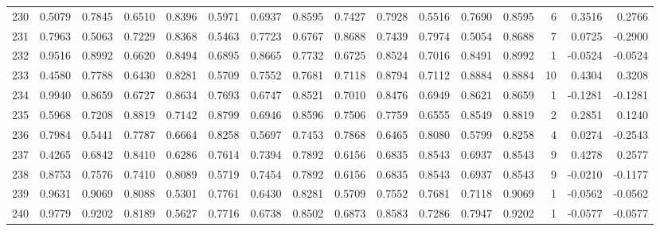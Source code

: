 \begin{tabular}{lrrrrrrrrrrrrrrr}
230 &      0.5079 &  0.7845 &  0.6510 &  0.8396 &  0.5971 &  0.6937 &  0.8595 &  0.7427 &  0.7928 &  0.5516 &   0.7690 &     0.8595 &      6 &                    0.3516 &                     0.2766 \\
231 &      0.7963 &  0.5063 &  0.7229 &  0.8368 &  0.5463 &  0.7723 &  0.6767 &  0.8688 &  0.7439 &  0.7974 &   0.5054 &     0.8688 &      7 &                    0.0725 &                    -0.2900 \\
232 &      0.9516 &  0.8992 &  0.6620 &  0.8494 &  0.6895 &  0.8665 &  0.7732 &  0.6725 &  0.8524 &  0.7016 &   0.8491 &     0.8992 &      1 &                   -0.0524 &                    -0.0524 \\
233 &      0.4580 &  0.7788 &  0.6430 &  0.8281 &  0.5709 &  0.7552 &  0.7681 &  0.7118 &  0.8794 &  0.7112 &   0.8884 &     0.8884 &     10 &                    0.4304 &                     0.3208 \\
234 &      0.9940 &  0.8659 &  0.6727 &  0.8634 &  0.7693 &  0.6747 &  0.8521 &  0.7010 &  0.8476 &  0.6949 &   0.8621 &     0.8659 &      1 &                   -0.1281 &                    -0.1281 \\
235 &      0.5968 &  0.7208 &  0.8819 &  0.7142 &  0.8799 &  0.6946 &  0.8596 &  0.7506 &  0.7759 &  0.6555 &   0.8549 &     0.8819 &      2 &                    0.2851 &                     0.1240 \\
236 &      0.7984 &  0.5441 &  0.7787 &  0.6664 &  0.8258 &  0.5697 &  0.7453 &  0.7868 &  0.6465 &  0.8080 &   0.5799 &     0.8258 &      4 &                    0.0274 &                    -0.2543 \\
237 &      0.4265 &  0.6842 &  0.8410 &  0.6286 &  0.7614 &  0.7394 &  0.7892 &  0.6156 &  0.6835 &  0.8543 &   0.6937 &     0.8543 &      9 &                    0.4278 &                     0.2577 \\
238 &      0.8753 &  0.7576 &  0.7410 &  0.8089 &  0.5719 &  0.7454 &  0.7892 &  0.6156 &  0.6835 &  0.8543 &   0.6937 &     0.8543 &      9 &                   -0.0210 &                    -0.1177 \\
239 &      0.9631 &  0.9069 &  0.8088 &  0.5301 &  0.7761 &  0.6430 &  0.8281 &  0.5709 &  0.7552 &  0.7681 &   0.7118 &     0.9069 &      1 &                   -0.0562 &                    -0.0562 \\
240 &      0.9779 &  0.9202 &  0.8189 &  0.5627 &  0.7716 &  0.6738 &  0.8502 &  0.6873 &  0.8583 &  0.7286 &   0.7947 &     0.9202 &      1 &                   -0.0577 &                    -0.0577 \\

\end{tabular}
